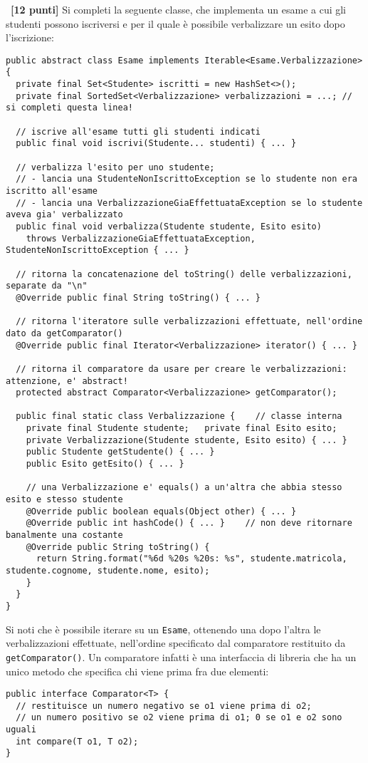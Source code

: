 \documentclass{article}[10pt]
\newcounter{esnu}
\newenvironment{esercizio}{\medskip \noindent {\bf Esercizio\addtocounter{esnu}{1} \arabic{esnu}}}{}
\begin{document}
\begin{esercizio}~\textbf{[12 punti]}
  Si completi la seguente classe, che implementa un esame a cui gli
  studenti possono iscriversi e per il quale \`e possibile verbalizzare
  un esito dopo l'iscrizione:
%
\begin{lstlisting}
public abstract class Esame implements Iterable<Esame.Verbalizzazione> {
  private final Set<Studente> iscritti = new HashSet<>();
  private final SortedSet<Verbalizzazione> verbalizzazioni = ...; // si completi questa linea!

  // iscrive all'esame tutti gli studenti indicati
  public final void iscrivi(Studente... studenti) { ... }

  // verbalizza l'esito per uno studente;
  // - lancia una StudenteNonIscrittoException se lo studente non era iscritto all'esame
  // - lancia una VerbalizzazioneGiaEffettuataException se lo studente aveva gia' verbalizzato
  public final void verbalizza(Studente studente, Esito esito)
    throws VerbalizzazioneGiaEffettuataException, StudenteNonIscrittoException { ... }

  // ritorna la concatenazione del toString() delle verbalizzazioni, separate da "\n"
  @Override public final String toString() { ... }

  // ritorna l'iteratore sulle verbalizzazioni effettuate, nell'ordine dato da getComparator()
  @Override public final Iterator<Verbalizzazione> iterator() { ... }

  // ritorna il comparatore da usare per creare le verbalizzazioni: attenzione, e' abstract!
  protected abstract Comparator<Verbalizzazione> getComparator();

  public final static class Verbalizzazione {    // classe interna
    private final Studente studente;   private final Esito esito;
    private Verbalizzazione(Studente studente, Esito esito) { ... }
    public Studente getStudente() { ... }
    public Esito getEsito() { ... }

    // una Verbalizzazione e' equals() a un'altra che abbia stesso esito e stesso studente
    @Override public boolean equals(Object other) { ... }
    @Override public int hashCode() { ... }    // non deve ritornare banalmente una costante
    @Override public String toString() {
      return String.format("%6d %20s %20s: %s", studente.matricola, studente.cognome, studente.nome, esito); 
    }
  }
}
\end{lstlisting}
%
  Si noti che \`e possibile iterare
  su un \texttt{Esame}, ottenendo una dopo l'altra le verbalizzazioni
  effettuate, nell'ordine specificato dal comparatore restituito da
  \texttt{getComparator()}. Un comparatore infatti \`e una interfaccia
  di libreria che ha un unico metodo che
  specifica chi viene prima fra due elementi:
%
\begin{lstlisting}
public interface Comparator<T> {
  // restituisce un numero negativo se o1 viene prima di o2;
  // un numero positivo se o2 viene prima di o1; 0 se o1 e o2 sono uguali
  int compare(T o1, T o2);
}
\end{lstlisting}


\end{esercizio}
\end{document}

